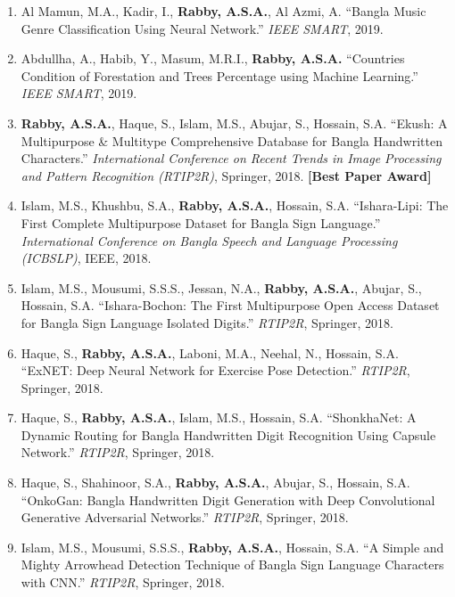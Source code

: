 \documentclass[11pt]{article}
\begin{document}
\begin{enumerate}
    \item Al Mamun, M.A., Kadir, I., \textbf{Rabby, A.S.A.}, Al Azmi, A. ``Bangla Music Genre Classification Using Neural Network.'' \textit{IEEE SMART}, 2019.
    
    \item Abdullha, A., Habib, Y., Masum, M.R.I., \textbf{Rabby, A.S.A.} ``Countries Condition of Forestation and Trees Percentage using Machine Learning.'' \textit{IEEE SMART}, 2019.

    \item \textbf{Rabby, A.S.A.}, Haque, S., Islam, M.S., Abujar, S., Hossain, S.A. ``Ekush: A Multipurpose \& Multitype Comprehensive Database for Bangla Handwritten Characters.'' \textit{International Conference on Recent Trends in Image Processing and Pattern Recognition (RTIP2R)}, Springer, 2018. \textbf{[Best Paper Award]}
    
    \item Islam, M.S., Khushbu, S.A., \textbf{Rabby, A.S.A.}, Hossain, S.A. ``Ishara-Lipi: The First Complete Multipurpose Dataset for Bangla Sign Language.'' \textit{International Conference on Bangla Speech and Language Processing (ICBSLP)}, IEEE, 2018.
    
    \item Islam, M.S., Mousumi, S.S.S., Jessan, N.A., \textbf{Rabby, A.S.A.}, Abujar, S., Hossain, S.A. ``Ishara-Bochon: The First Multipurpose Open Access Dataset for Bangla Sign Language Isolated Digits.'' \textit{RTIP2R}, Springer, 2018.
    
    \item Haque, S., \textbf{Rabby, A.S.A.}, Laboni, M.A., Neehal, N., Hossain, S.A. ``ExNET: Deep Neural Network for Exercise Pose Detection.'' \textit{RTIP2R}, Springer, 2018.
    
    \item Haque, S., \textbf{Rabby, A.S.A.}, Islam, M.S., Hossain, S.A. ``ShonkhaNet: A Dynamic Routing for Bangla Handwritten Digit Recognition Using Capsule Network.'' \textit{RTIP2R}, Springer, 2018.
    
    \item Haque, S., Shahinoor, S.A., \textbf{Rabby, A.S.A.}, Abujar, S., Hossain, S.A. ``OnkoGan: Bangla Handwritten Digit Generation with Deep Convolutional Generative Adversarial Networks.'' \textit{RTIP2R}, Springer, 2018.
    
    \item Islam, M.S., Mousumi, S.S.S., \textbf{Rabby, A.S.A.}, Hossain, S.A. ``A Simple and Mighty Arrowhead Detection Technique of Bangla Sign Language Characters with CNN.'' \textit{RTIP2R}, Springer, 2018.
    

\end{enumerate}
\end{document}
